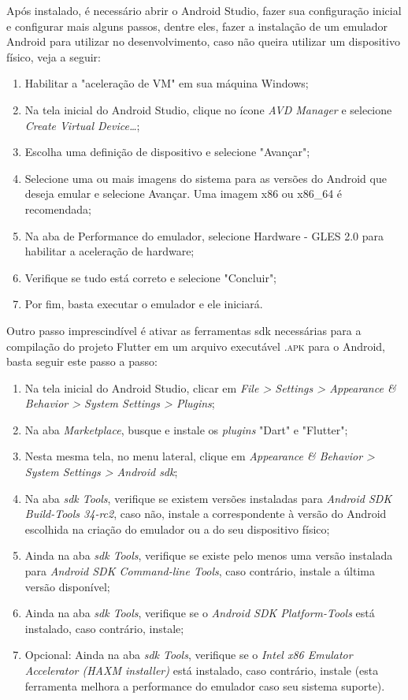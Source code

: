 Após instalado, é necessário abrir o Android Studio, fazer sua configuração inicial e configurar mais alguns passos, dentre eles, fazer a instalação de um emulador Android para utilizar no desenvolvimento, caso não queira utilizar um dispositivo físico, veja a seguir:
\begin{enumerate}
   \item Habilitar a "aceleração de VM" em sua máquina Windows;
   \item Na tela inicial do Android Studio, clique no ícone \textit{AVD Manager} e selecione \textit{Create Virtual Device…};
   \item Escolha uma definição de dispositivo e selecione "Avançar";
   \item Selecione uma ou mais imagens do sistema para as versões do Android que deseja emular e selecione Avançar. Uma imagem x86 ou x86\_64 é recomendada;
   \item Na aba de Performance do emulador, selecione Hardware - GLES 2.0 para habilitar a aceleração de hardware;
   \item Verifique se tudo está correto e selecione "Concluir";
   \item Por fim, basta executar o emulador e ele iniciará.
 \end{enumerate}

 Outro passo imprescindível é ativar as ferramentas \ac{sdk} necessárias para a compilação do projeto Flutter em um arquivo executável \textsc{.apk} para o Android, basta seguir este passo a passo:
 
 \begin{enumerate}
   \item Na tela inicial do Android Studio, clicar em \textit{File > Settings > Appearance \& Behavior > System Settings > \textit{Plugins}};
   \item Na aba \textit{Marketplace}, busque e instale os \textit{plugins} "Dart" e "Flutter";
   \item Nesta mesma tela, no menu lateral, clique em \textit{Appearance \& Behavior > System Settings > Android \ac{sdk}};
   \item Na aba \textit{\ac{sdk} Tools}, verifique se existem versões instaladas para \textit{Android SDK Build-Tools 34-rc2}, caso não, instale a correspondente à versão do Android escolhida na criação do emulador ou a do seu dispositivo físico;
   \item Ainda na aba \textit{\ac{sdk} Tools}, verifique se existe pelo menos uma versão instalada para \textit{Android SDK Command-line Tools}, caso contrário, instale a última versão disponível;
   \item Ainda na aba \textit{\ac{sdk} Tools}, verifique se o \textit{Android SDK Platform-Tools} está instalado, caso contrário, instale;
   \item Opcional: Ainda na aba \textit{\ac{sdk} Tools}, verifique se o \textit{Intel x86 Emulator Accelerator (HAXM installer)} está instalado, caso contrário, instale (esta ferramenta melhora a performance do emulador caso seu sistema suporte).
 \end{enumerate}
 
